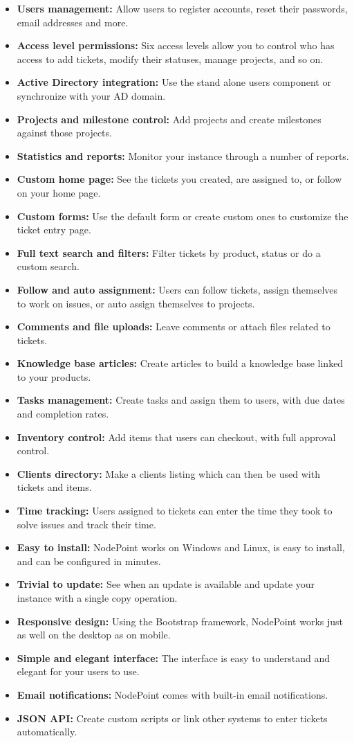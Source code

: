 \documentclass[11pt]{article}
\begin{document}
\begin{itemize}
\item \textbf{Users management:}  Allow users to register accounts, reset their passwords, email addresses and more.
\item \textbf{Access level permissions:} Six access levels allow you to control who has access to add tickets, modify their statuses, manage projects, and so on.
\item \textbf{Active Directory integration:} Use the stand alone users component or synchronize with your AD domain.
\item \textbf{Projects and milestone control:} Add projects and create milestones against those projects.
\item \textbf{Statistics and reports:} Monitor your instance through a number of reports.
\item \textbf{Custom home page:} See the tickets you created, are assigned to, or follow on your home page.
\item \textbf{Custom forms:} Use the default form or create custom ones to customize the ticket entry page.
\item \textbf{Full text search and filters:} Filter tickets by product, status or do a custom search.
\item \textbf{Follow and auto assignment:} Users can follow tickets, assign themselves to work on issues, or auto assign themselves to projects.
\item \textbf{Comments and file uploads:} Leave comments or attach files related to tickets.
\item \textbf{Knowledge base articles:} Create articles to build a knowledge base linked to your products.
\item \textbf{Tasks management:} Create tasks and assign them to users, with due dates and completion rates.
\item \textbf{Inventory control:} Add items that users can checkout, with full approval control.
\item \textbf{Clients directory:} Make a clients listing which can then be used with tickets and items.
\item \textbf{Time tracking:} Users assigned to tickets can enter the time they took to solve issues and track their time.
\item \textbf{Easy to install:} NodePoint works on Windows and Linux, is easy to install, and can be configured in minutes.
\item \textbf{Trivial to update:} See when an update is available and update your instance with a single copy operation.
\item \textbf{Responsive design:} Using the Bootstrap framework, NodePoint works just as well on the desktop as on mobile.
\item \textbf{Simple and elegant interface:} The interface is easy to understand and elegant for your users to use.
\item \textbf{Email notifications:} NodePoint comes with built-in email notifications.
\item \textbf{JSON API:} Create custom scripts or link other systems to enter tickets automatically.
\end{itemize}
\end{document}
